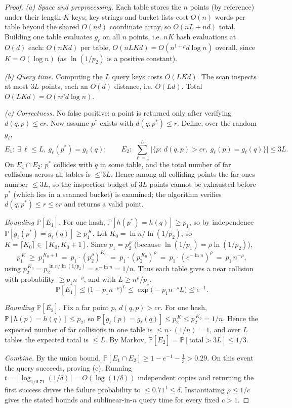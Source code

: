 \documentclass{amsart}
\renewcommand{\Pr}{\mathbb{P}}
\begin{document}
\begin{proof}
\emph{(a) Space and preprocessing.}  Each table stores the $n$ points (by reference)
under their length-$K$ keys; key strings and bucket lists cost $O(n)$ words per table
beyond the shared $O(nd)$ coordinate array, so $O(nL+nd)$ total.  Building one table
evaluates $g_\ell$ on all $n$ points, i.e. $nK$ hash evaluations at $O(d)$ each:
$O(nKd)$ per table, $O(nLKd)=O(n^{1+\rho}d\log n)$ overall, since $K=O(\log n)$ (as
$\ln(1/p_2)$ is a positive constant).

\emph{(b) Query time.}  Computing the $L$ query keys costs $O(LKd)$.  The scan
inspects at most $3L$ points, each an $O(d)$ distance, i.e. $O(Ld)$.  Total
$O(LKd)=O(n^{\rho}d\log n)$.

\emph{(c) Correctness.}  No false positive: a point is returned only after verifying
$d(q,p)\le cr$.  Now assume $p^\ast$ exists with $d(q,p^\ast)\le r$.  Define, over the
random $g_\ell$,
\[
E_1:\ \exists\,\ell\le L,\ g_\ell(p^\ast)=g_\ell(q);
\qquad
E_2:\ \sum_{\ell=1}^L \big|\{p:\,d(q,p)>cr,\ g_\ell(p)=g_\ell(q)\}\big|\le 3L .
\]
On $E_1\cap E_2$: $p^\ast$ collides with $q$ in some table, and the total number of
far collisions across all tables is $\le 3L$.  Hence among all colliding points the
far ones number $\le 3L$, so the inspection budget of $3L$ points cannot be exhausted
before $p^\ast$ (which lies in a scanned bucket) is examined; the algorithm verifies
$d(q,p^\ast)\le r\le cr$ and returns a valid point.

\emph{Bounding $\Pr[\overline{E_1}]$.}  For one hash, $\Pr[h(p^\ast)=h(q)]\ge p_1$, so
by independence $\Pr[g_\ell(p^\ast)=g_\ell(q)]\ge p_1^{\,K}$.  Let
$K_0=\ln n/\ln(1/p_2)$, so $K=\lceil K_0\rceil\in[K_0,K_0+1]$.  Since $p_1=p_2^{\rho}$
(because $\ln(1/p_1)=\rho\ln(1/p_2)$),
\[
p_1^{\,K}\ \ge\ p_1^{\,K_0+1}\ =\ p_1\cdot (p_2^{\rho})^{K_0}\ =\ p_1\cdot (p_2^{\,K_0})^{\rho}
\ =\ p_1\cdot (e^{-\ln n})^{\rho}\ =\ p_1\,n^{-\rho},
\]
using $p_2^{\,K_0}=p_2^{\,\ln n/\ln(1/p_2)}=e^{-\ln n}=1/n$.  Thus each table gives a
near collision with probability $\ge p_1 n^{-\rho}$, and with $L\ge n^{\rho}/p_1$,
\[
\Pr[\overline{E_1}]\le \big(1-p_1 n^{-\rho}\big)^{L}
\le \exp\!\big(-p_1 n^{-\rho} L\big)\le e^{-1}.
\]

\emph{Bounding $\Pr[\overline{E_2}]$.}  Fix a far point $p$, $d(q,p)>cr$.  For one
hash, $\Pr[h(p)=h(q)]\le p_2$, so $\Pr[g_\ell(p)=g_\ell(q)]\le p_2^{\,K}\le
p_2^{\,K_0}=1/n$.  Hence the expected number of far collisions in one table is
$\le n\cdot(1/n)=1$, and over $L$ tables the expected total is $\le L$.  By Markov,
$\Pr[\overline{E_2}]=\Pr[\text{total}>3L]\le 1/3$.

\emph{Combine.}  By the union bound,
$\Pr[E_1\cap E_2]\ge 1-e^{-1}-\tfrac13>0.29$.  On this event the query succeeds,
proving (c).  Running $t=\lceil \log_{1/0.71}(1/\delta)\rceil=O(\log(1/\delta))$
independent copies and returning the first success drives the failure probability to
$\le 0.71^{\,t}\le\delta$.  Instantiating $\rho\le 1/c$ gives the stated bounds and
sublinear-in-$n$ query time for every fixed $c>1$.
\end{proof}
\end{document}
